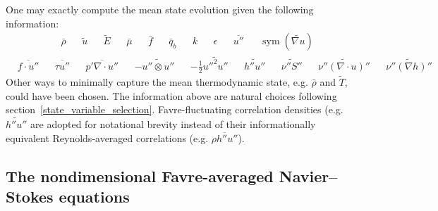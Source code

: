 \documentclass[letterpaper,11pt,nointlimits,reqno,draft]{amsart}
\newcommand{\symmetricpart}[1]
  {\ensuremath{\operatorname{sym}\left(#1\right)}}
\begin{document}
One may exactly compute the mean state evolution given the following
information:
\begin{align}
&\bar{\rho}
&
&\tilde{u}
&
&\tilde{E}
&
&\bar{\mu}
&
&\bar{f}
&
&\bar{q}_b
&
&k
&
&\epsilon
&
&\overline{u''}
&
&\symmetricpart{\widetilde{\nabla{}u}}
\end{align}
\begin{align}
&\overline{f\cdot{}u''}
&
&\overline{\tau{}u''}
&
&\overline{p'\nabla\cdot{}u''}
&
&-\widetilde{u''\otimes{}u''}
&
&-\frac{1}{2}\widetilde{{u''}^{2}u''}
&
&\widetilde{h''u''}
&
&\widetilde{\nu''S''}
&
&\widetilde{\nu''\left(\nabla\cdot{}u\right)''}
&
&\widetilde{\nu''\left(\nabla{}h\right)''}
\end{align}
Other ways to minimally capture the mean thermodynamic state, e.g. $\bar{\rho}$
and $\tilde{T}$, could have been chosen.  The information above are natural
choices following section~\ref{state_variable_selection}.  Favre-fluctuating
correlation densities (e.g.  $\widetilde{h''u''}$ are adopted for notational
brevity instead of their informationally equivalent Reynolds-averaged
correlations (e.g.  $\overline{\rho{}h''u''}$).

\subsection{The nondimensional Favre-averaged Navier--Stokes equations}
\label{sec:nondimfans}
\end{document}
